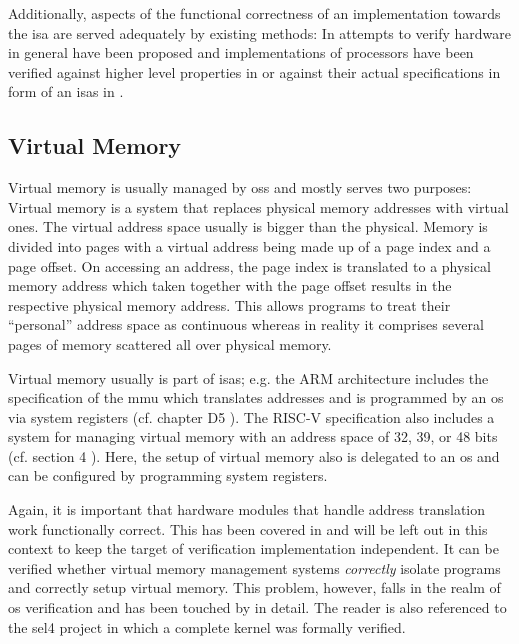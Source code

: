 Additionally, aspects of the functional correctness of an implementation towards the \gls{isa} are served adequately by existing methods:
In \cite{Mukherjee16} attempts to verify hardware in general have been proposed and implementations of processors have been verified against higher level properties in \cite{Zhang15, Beatty94, Berezin98, Trippel19} or against their actual specifications in form of an \glspl{isa} in \cite{Burch94, Reid16, RISCV-formal}.

\subsection{Virtual Memory}
\label{sec:virtual-memory}

Virtual memory is usually managed by \glspl{os} and mostly serves two purposes: 
Virtual memory is a system that replaces physical memory addresses with virtual ones.
The virtual address space usually is bigger than the physical.
Memory is divided into pages with a virtual address being made up of a page index and a page offset.
On accessing an address, the page index is translated to a physical memory address which taken together with the page offset results in the respective physical memory address.
This allows programs to treat their \enquote{personal} address space as continuous whereas in reality it comprises several pages of memory scattered all over physical memory.

Virtual memory usually is part of \glspl{isa}; e.g. the ARM architecture includes the specification of the \gls{mmu} which translates addresses and is programmed by an \gls{os} via system registers (cf. chapter D5 \cite{Armv8}).
The RISC-V specification also includes a system for managing virtual memory with an address space of 32, 39, or 48 bits (cf. section 4 \cite{RiscVISAP}).
Here, the setup of virtual memory also is delegated to an \gls{os} and can be configured by programming system registers.

Again, it is important that hardware modules that handle address translation work functionally correct.
This has been covered in \cite{Dalinger05} and will be left out in this context to keep the target of verification implementation independent.
It can be verified whether virtual memory management systems \textit{correctly} isolate programs and correctly setup virtual memory.
This problem, however, falls in the realm of \gls{os} verification and has been touched by \cite{Vaynberg12} in detail.
The reader is also referenced to the sel4 project \cite{Klein09} in which a complete kernel was formally verified.

